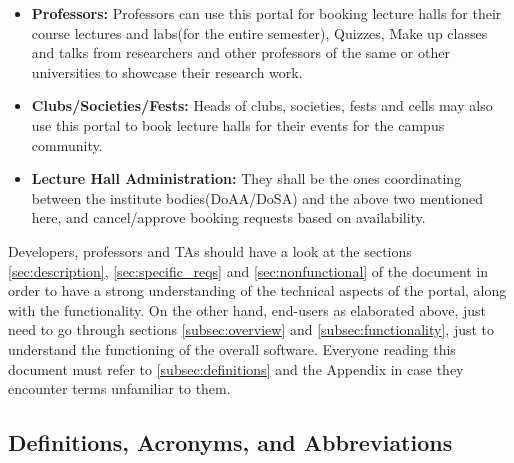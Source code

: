 \documentclass[a4paper,12pt]{article}
\begin{document}
\begin{itemize}
    \item \textbf{Professors:}  Professors can use this portal for booking lecture halls for their course lectures and labs(for the entire semester), Quizzes, Make up classes and talks from researchers and other professors of the same or other universities to showcase their research work.
    \item \textbf{Clubs/Societies/Fests:} Heads of clubs, societies, fests and cells may also use this portal to book lecture halls for their events for the campus community.
    \item \textbf{Lecture Hall Administration:} They shall be the ones coordinating between the institute bodies(DoAA/DoSA) and the above two mentioned here, and cancel/approve booking requests based on availability. 

\end{itemize}
Developers, professors and TAs should have a look at the sections \ref{sec:description}, \ref{sec:specific_reqs} and \ref{sec:nonfunctional} of the document in order to have a strong understanding of the technical aspects of the portal, along with the functionality.
On the other hand, end-users as elaborated above, just need to go through sections \ref{subsec:overview} and \ref{subsec:functionality}, just to understand the functioning of the overall software.
Everyone reading this document must refer to \ref{subsec:definitions} and the Appendix in case they encounter terms unfamiliar to them. 
\newpage
\subsection{Definitions, Acronyms, and Abbreviations \label{subsec:definitions}}

\end{document}
